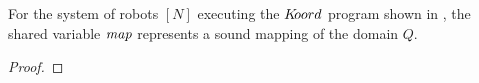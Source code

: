 %
%


\begin{theorem}
    For the system of robots $[N]$ executing the $K\kern-2pt oord$ program shown in , the shared variable $\mathit{map}$ represents a sound mapping of the domain $Q$.
\end{theorem}

\begin{proof}

\end{proof}

